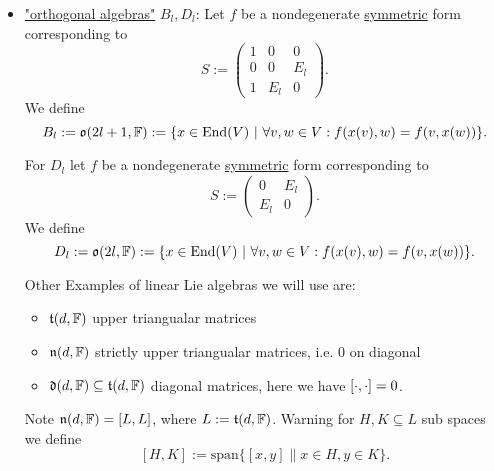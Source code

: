\begin{example}
\begin{itemize}[label=]
        \item \underline{"orthogonal algebras"} $B_l,D_l$:
        \renewcommand{\o}{\mathfrak{o}}
        Let $f$ be a nondegenerate \underline{symmetric} form corresponding to
        $$ S := \begin{pmatrix}
            1 & 0 & 0 \\
            0 & 0 & E_l \\
            1 & E_l & 0
        \end{pmatrix}.$$
        We define
        $$B_l := \o(2l+1, \F) := \{x \in \End(V) \| \forall v,w \in V: f(x(v),w) = f(v, x(w))\}.$$
        
        For $D_l$ let $f$ be a nondegenerate \underline{symmetric} form corresponding to
        $$ S := \begin{pmatrix}
            0 & E_l \\
            E_l & 0
        \end{pmatrix}.$$
        We define
        $$D_l := \o(2l, \F) := \{x \in \End(V) \| \forall v,w \in V: f(x(v),w) = f(v, x(w))\}.$$
        
        Other Examples of linear Lie algebras we will use are:
        \begin{itemize}
            \item $\mathfrak{t}(d,\mathbb{F})$ upper triangualar matrices
            \item $\mathfrak{n}(d,\mathbb{F})$ strictly upper triangualar matrices, i.e. 0 on diagonal
            \item $\mathfrak{d}(d,\mathbb{F}) \subseteq \mathfrak{t}(d,\mathbb{F})$ diagonal matrices, here we have $[\cdot,\cdot] = 0$.
        \end{itemize}
        Note $ \mathfrak{n}(d, \mathbb{F}) = [L,L]$, where $L:= \mathfrak{t}(d,\mathbb{F})$.
        Warning for $H,K \subseteq L$ sub spaces we define
        $$ [H,K] := \text{span} \{[x,y] \| x\in H,y \in K\}. $$
    \end{itemize}
\end{example}
